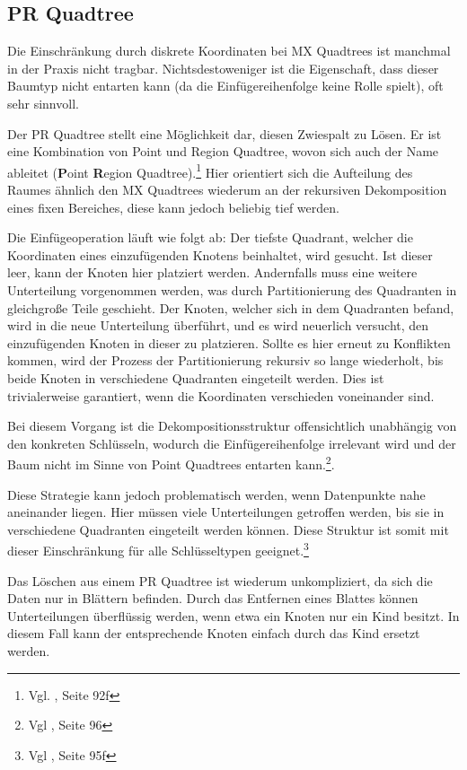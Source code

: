 \documentclass[%
			paper=a4,%
			DIV12,
			liststotoc,
			bibtotoc,
			draft=false,%
			titlepage
			]{scrartcl}
\newcommand{\zit}[3]{#1 \cite{#2}, #3}
\newcommand{\footzit}[3]{\footnote{\zit{#1}{#2}{#3}}}
\begin{document}
\subsection{PR Quadtree}

Die Einschränkung durch diskrete Koordinaten bei MX Quadtrees ist manchmal in der Praxis nicht tragbar.
Nichtsdestoweniger ist die Eigenschaft, dass dieser Baumtyp nicht entarten kann (da die Einfügereihenfolge keine Rolle spielt), oft sehr sinnvoll. 

Der PR Quadtree stellt eine Möglichkeit dar, diesen Zwiespalt zu Lösen. 
Er ist eine Kombination von Point und Region Quadtree, wovon sich auch der Name ableitet (\textbf{P}oint \textbf{R}egion Quadtree).\footzit{Vgl.}{Samet90}{Seite 92f}
Hier orientiert sich die Aufteilung des Raumes ähnlich den MX Quadtrees wiederum an der rekursiven Dekomposition eines fixen Bereiches, diese kann jedoch beliebig tief werden.

Die Einfügeoperation läuft wie folgt ab:
Der tiefste Quadrant, welcher die Koordinaten eines einzufügenden Knotens beinhaltet, wird gesucht.
Ist dieser leer, kann der Knoten hier platziert werden.
Andernfalls muss eine weitere Unterteilung vorgenommen werden, was durch Partitionierung des Quadranten in gleichgroße Teile geschieht. 
Der Knoten, welcher sich in dem Quadranten befand, wird in die neue Unterteilung überführt, und es wird neuerlich versucht, den einzufügenden Knoten in dieser zu platzieren. 
Sollte es hier erneut zu Konflikten kommen, wird der Prozess der Partitionierung rekursiv so lange wiederholt, bis beide Knoten in verschiedene Quadranten eingeteilt werden.
Dies ist trivialerweise garantiert, wenn die Koordinaten verschieden voneinander sind.

Bei diesem Vorgang ist die Dekompositionsstruktur offensichtlich unabhängig von den konkreten Schlüsseln, wodurch die Einfügereihenfolge irrelevant wird und der Baum nicht im Sinne von Point Quadtrees entarten kann.\footzit{Vgl}{Samet90}{Seite 96}.

Diese Strategie kann jedoch problematisch werden, wenn Datenpunkte nahe aneinander liegen.
Hier müssen viele Unterteilungen getroffen werden, bis sie in verschiedene Quadranten eingeteilt werden können. 
Diese Struktur ist somit mit dieser Einschränkung für alle Schlüsseltypen geeignet.\footzit{Vgl}{Samet90}{Seite 95f}

Das Löschen aus einem PR Quadtree ist wiederum unkompliziert, da sich die Daten nur in Blättern befinden.
Durch das Entfernen eines Blattes können Unterteilungen überflüssig werden, wenn etwa ein Knoten nur ein Kind besitzt.
In diesem Fall kann der entsprechende Knoten einfach durch das Kind ersetzt werden.
\end{document}
